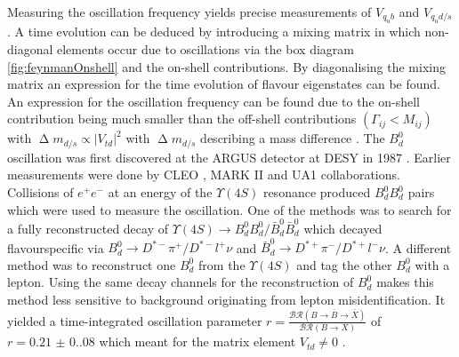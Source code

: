 Measuring the oscillation frequency yields precise measurements of $V_{q_u b}$ and $V_{q_u d/s}$.
A time evolution can be deduced by introducing a mixing matrix in which non-diagonal elements occur due to oscillations via the box diagram \ref{fig:feynmanOnshell} and the on-shell contributions.
By diagonalising the mixing matrix an expression for the time evolution of flavour eigenstates can be found.
An expression for the oscillation frequency can be found due to the on-shell contribution being much smaller than the off-shell contributions $(\Gamma_{ij}<M_{ij})$ with $\upDelta m_{d/s}\propto |V_{td}|^2$ with $\upDelta m_{d/s}$ describing a mass difference \cite{artuso2019cp}.
The $B_d^0$ oscillation was first discovered at the ARGUS detector at DESY in 1987 \cite{ALBRECHT1987245}.
Earlier measurements were done by CLEO \cite{PhysRevLett.58.183}, MARK II \cite{SCHAAD1985188} and UA1 \cite{ALBAJAR1987247} collaborations.
Collisions of $e^+e^-$ at an energy of the $\Upsilon(4S)$ resonance produced $B^0_dB^0_d$ pairs which were used to measure the oscillation.
One of the methods was to search for a fully reconstructed decay of $\Upsilon(4S)\rightarrow B^0_dB^0_d /\bar B^0_d\bar B^0_d$ which decayed flavourspecific via $B_d^0\rightarrow D^{*-}\pi^+/D^{*-}l^+\nu$ and  $\bar B_d^0\rightarrow D^{*+}\pi^-/D^{*+}l^-\nu$.
A different method was to reconstruct one $B_d^0$ from the $\Upsilon(4S)$ and tag the other $B_d^0$ with a lepton.
Using the same decay channels for the reconstruction of $B_d^0$ makes this method less sensitive to background originating from lepton misidentification.
It yielded a time-integrated oscillation parameter $r= \frac{\mathcal{BR}(B\rightarrow \bar B\rightarrow \bar X)}{\mathcal{BR}(B\rightarrow X)}$ of $r=\num{0.21(0.08)}$ which meant for the matrix element $V_{td}\neq 0$ \cite{ALBRECHT1987245}.

